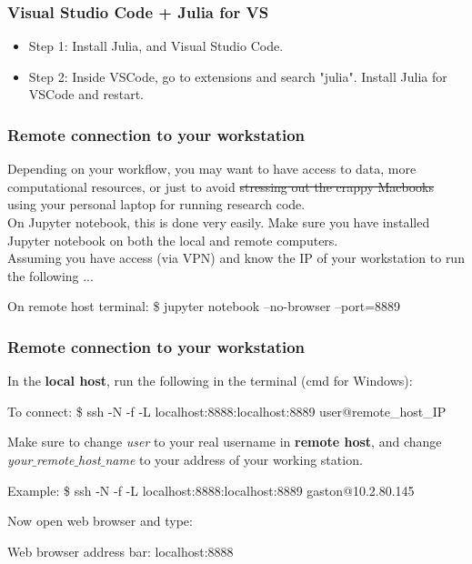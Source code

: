 \documentclass{beamer}
\begin{document}
\begin{frame}
\frametitle{Visual Studio Code + Julia for VS}
\begin{itemize}
\item Step 1: Install Julia, and Visual Studio Code.
\item Step 2: Inside VSCode, go to extensions and search "julia". Install Julia for VSCode and restart.
\end{itemize}
\end{frame}

\begin{frame}
\frametitle{Remote connection to your workstation}

Depending on your workflow, you may want to have access to data, more computational resources, or just to avoid \sout{stressing out the crappy Macbooks} using your personal laptop for running research code.\\

On Jupyter notebook, this is done very easily. Make sure you have installed Jupyter notebook on both the local and remote computers.\\

Assuming you have access (via VPN) and know the IP of your workstation to run the following ...\\

\begin{block}{On remote host terminal:}
    \$ jupyter notebook --no-browser --port=8889
\end{block}

\end{frame}

\begin{frame}
\frametitle{Remote connection to your workstation}
In the \textbf{local host}, run the following in the terminal (cmd for Windows):\\

\begin{block}{To connect:}
\$ ssh -N -f -L localhost:8888:localhost:8889 user@remote\_host\_IP
\end{block}

Make sure to change \textit{user} to your real username in \textbf{remote host}, and change \textit{your$\_$remote$\_$host$\_$name} to your address of your working station. \\

\begin{block}{Example:}
\$ ssh -N -f -L localhost:8888:localhost:8889 gaston@10.2.80.145
\end{block}

Now open web browser and type:\\

\begin{block}{Web browser address bar:}
localhost:8888
\end{block}

\end{frame}
\end{document}
